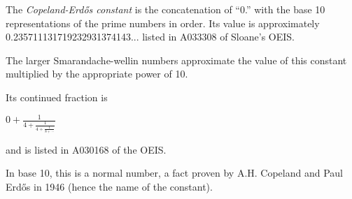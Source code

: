 \documentclass[12pt]{article}
\begin{document}
The \emph{Copeland-Erd\H{o}s constant} is the concatenation of ``0.'' with the base 10 representations of the prime numbers in order. Its value is approximately 0.235711131719232931374143... listed in A033308 of Sloane's OEIS.

The larger Smarandache-wellin numbers approximate the value of this constant multiplied by the appropriate power of 10.

Its continued fraction is

$0 + \frac{1}{4 + \frac{1}{4 + \frac{1}{8+\,\cdots}}}$

and is listed in A030168 of the OEIS.

In base 10, this is a normal number, a fact proven by A.H. Copeland and Paul Erd\H{o}s in 1946 (hence the name of the constant).
\end{document}
